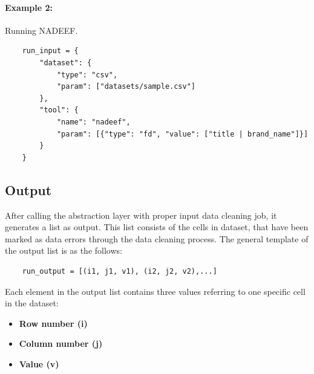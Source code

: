 \documentclass[12pt]{article}
\begin{document}
\paragraph{Example 2:} Running NADEEF.
\begin{lstlisting}
	run_input = {
		"dataset": {
			"type": "csv",
			"param": ["datasets/sample.csv"]
		},
		"tool": {
			"name": "nadeef",
			"param": [{"type": "fd", "value": ["title | brand_name"]}]
		}
	}
\end{lstlisting}


\subsection{Output}
After calling the abstraction layer with proper input data cleaning job, it generates a list as output. This list consists of the cells in dataset, that have been marked as data errors through the data cleaning process. The general template of the output list is as the follows:
\begin{lstlisting}
	run_output = [(i1, j1, v1), (i2, j2, v2),...]
\end{lstlisting}
Each element in the output list contains three values referring to one specific cell in the dataset:
\begin{itemize}
	\item \textbf{Row number (i)}
	\item \textbf{Column number (j)}
	\item \textbf{Value (v)} 
\end{itemize}




\end{document}
